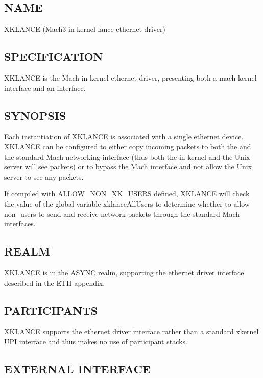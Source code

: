 %
%
%

\subsection*{NAME}

\noindent XKLANCE (Mach3 in-kernel lance ethernet driver)

\subsection*{SPECIFICATION}

\noindent

XKLANCE is the Mach in-kernel ethernet driver, presenting both a
mach kernel interface and an \xk{} interface.


\subsection*{SYNOPSIS}

\noindent 

Each instantiation of XKLANCE is associated with a single ethernet
device.  XKLANCE can be configured to either copy incoming packets
to both the \xk{} and the standard Mach networking interface (thus
both the in-kernel \xk{} and the Unix server will see packets) or to
bypass the Mach interface and not allow the Unix server to see any
packets. 

If compiled with ALLOW\_NON\_XK\_USERS defined, XKLANCE will check the
value of the global variable xklanceAllUsers to determine whether to
allow non-\xk{} users to send and receive network packets through the
standard Mach interfaces.


\subsection*{REALM}

XKLANCE is in the ASYNC realm, supporting the ethernet driver interface
described in the ETH appendix.


\subsection*{PARTICIPANTS}

XKLANCE supports the ethernet driver interface rather than a standard
xkernel UPI interface and thus makes no use of participant stacks.


\subsection*{EXTERNAL INTERFACE}

